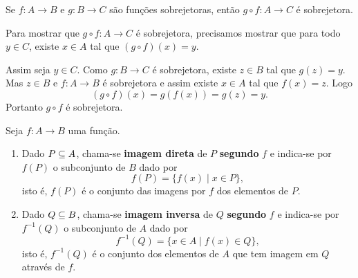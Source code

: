 \begin{proposicao}
	Se $f : A \to B$ e $g : B \to C$ s{\~a}o fun\c{c}\~oes sobrejetoras, ent{\~a}o $g\circ f : A \to C$ {\'e} sobrejetora.
\end{proposicao}
\begin{prova}
 	Para mostrar que $g \circ f : A \to C$ \'e sobrejetora, precisamos mostrar que para todo $y \in C$, existe $x \in A$ tal que $(g\circ f)(x) = y$.

 	Assim seja $y \in C$. Como $g : B \to C$ \'e sobrejetora, existe $z \in B$ tal que $g(z) = y$. Mas $z \in B$ e $f : A \to B$ \'e sobrejetora e assim existe $x \in A$ tal que $f(x) = z$. Logo
 	\[
 		(g\circ f)(x) = g(f(x)) = g(z) = y.
 	\]
 	Portanto $g \circ f$ \'e sobrejetora.
\end{prova}

\begin{definicao}
	Seja $f : A \to B$ uma fun{\c c}{\~a}o.
	\begin{enumerate}[label={\roman*})]
		\item Dado $P \subseteq A$, chama-se \textbf{imagem direta} de $P$  \textbf{segundo} $f$ e indica-se por $f(P)$ o subconjunto de $B$ dado por
		\[
			f(P) = \{f(x) \mid x \in P\},
		\]
		isto {\'e}, $f(P)$ {\'e} o conjunto das imagens por $f$ dos elementos de $P$.

		\item Dado $Q \subseteq B$, chama-se \textbf{imagem inversa} de $Q$ \textbf{segundo} $f$ e indica-se por $f^{-1}(Q)$ o subconjunto de $A$ dado por
		\[
			f^{-1}(Q) = \{x \in A \mid f(x) \in Q\},
		\]
		isto {\'e}, $f^{-1}(Q)$ {\'e} o conjunto dos elementos de $A$ que tem imagem em $Q$ atrav{\'e}s de $f$.
	\end{enumerate}
\end{definicao}

